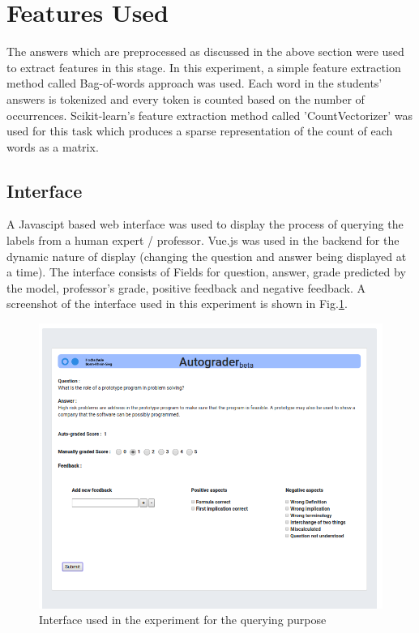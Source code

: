 \section{Features Used}

The answers which are preprocessed as discussed in the above section were used to extract features in this stage. In this experiment, a simple feature extraction method called Bag-of-words approach was used. Each word in the students' answers is tokenized and every token is counted based on the number of occurrences. Scikit-learn's feature extraction method called 'CountVectorizer' was used for this task which produces a sparse representation of the count of each words as a matrix.

\subsection{Interface}

A Javascipt based web interface was used to display the process of querying the labels from a human expert / professor. Vue.js was used in the backend for the dynamic nature of display (changing the question and answer being displayed at a time). The interface consists of Fields for question, answer, grade predicted by the model, professor's grade, positive feedback and negative feedback. A screenshot of the interface used in this experiment is shown in Fig.\ref{gui_layout}.

\begin{figure}[h]
	\centering
	\includegraphics[scale=0.6]{images/gui_layout}
	\caption{Interface used in the experiment for the querying purpose}
	\label{gui_layout}
\end{figure}

